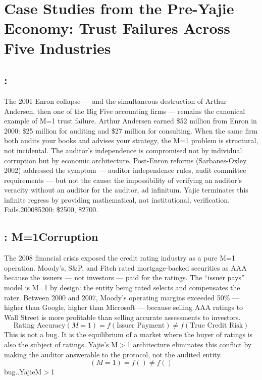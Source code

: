\documentclass[12pt,a4paper]{article}
\theoremstyle{remark}
\begin{document}
\section{Case Studies from the Pre-Yajie Economy: Trust Failures Across Five Industries}
\subsection{:}
The 2001 Enron collapse --- and the simultaneous destruction of Arthur Andersen, then one 
of the Big Five accounting firms --- remains the canonical example of M=1 trust failure. 
Arthur Andersen earned \$52 million from Enron in 2000: \$25 million for auditing and 
\$27 million for consulting. When the same firm both audits your books and advises your 
strategy, the M=1 problem is structural, not incidental. The auditor's independence is 
compromised not by individual corruption but by economic architecture.
Post-Enron reforms (Sarbanes-Oxley 2002) addressed the symptom --- auditor independence 
rules, audit committee requirements --- but not the cause: the impossibility of verifying 
an auditor's veracity without an auditor for the auditor, ad infinitum. Yajie terminates 
this infinite regress by providing mathematical, not institutional, verification.
\medskip
Fails.2000\$5200: \$2500, \$2700.
\subsection{: M=1Corruption}
The 2008 financial crisis exposed the credit rating industry as a pure M=1 operation. 
Moody's, S\&P, and Fitch rated mortgage-backed securities as AAA because the issuers 
--- not investors --- paid for the ratings. The ``issuer pays'' model is M=1 by design: 
the entity being rated selects and compensates the rater. Between 2000 and 2007, Moody's 
operating margins exceeded 50\% --- higher than Google, higher than Microsoft --- because 
selling AAA ratings to Wall Street is more profitable than selling accurate assessments 
to investors.
\begin{equation}
 \text{Rating Accuracy}(M=1) = f(\text{Issuer Payment}) \neq f(\text{True Credit Risk})
\end{equation}
This is not a bug. It is the equilibrium of a market where the buyer of ratings is also 
the subject of ratings. Yajie's M$>$1 architecture eliminates this conflict by making 
the auditor answerable to the protocol, not the audited entity.
\medskip
\begin{equation}
 \text{}(M=1) = f(\text{}) \neq f(\text{})
\end{equation}
bug..YajieM$>$1
\end{document}
